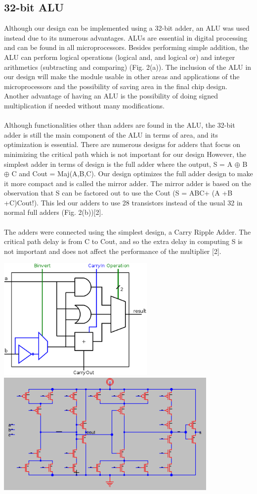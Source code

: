 \documentclass{report}
\begin{document}
 \subsection*{32-bit ALU}
 Although our design can be implemented using a 32-bit adder, an ALU was used instead due to its numerous advantages. ALUs are essential in digital processing and can be found in all microprocessors. Besides  performing simple addition, the ALU can perform logical operations (logical and, and logical or) and integer arithmetics (subtracting and comparing) (Fig. 2(a)). The inclusion of the ALU in our design will make the module usable in other areas and applications of the microprocessors and the possibility of saving area in the final chip design. Another advantage of having an ALU is the possibility of doing signed multiplication if needed without many modifications.
 \\\\
 Although functionalities other than adders are found in the ALU, the 32-bit adder is still the main component of the ALU in terms of area, and its optimization is essential. There are numerous designs for adders that focus on minimizing the critical path which is not important for our design However, the simplest adder in terms of design is the full adder where the output, S = A $\oplus$  B $\oplus$ C and Cout = Maj(A,B,C). Our design optimizes the full adder design to make it more compact and is called the mirror adder. The mirror adder is based on the observation that S can be factored out to use the Cout (S = ABC+ (A +B +C)Cout!). This led our adders to use 28 transistors instead of the usual 32 in normal full adders (Fig. 2(b))[2]. 
 \\\\
 The adders were connected using the simplest design, a Carry Ripple Adder. The critical path delay is from C to Cout, and so the extra delay in computing S is not important and does not affect the performance of the multiplier [2].
 \begin{center} \includegraphics[height=6cm]{Alu_schem.png}	\includegraphics[height=6cm]{adder_schem.png}\end{center}
\end{document}
